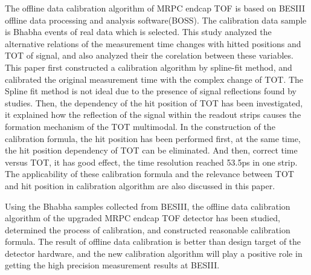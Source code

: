 \begin{englishabstract}
The offline data calibration algorithm of MRPC endcap TOF is based on BESIII offline data processing and analysis software(BOSS). The calibration data sample is Bhabha events of real data which is selected.
This study analyzed the alternative relations of the measurement time changes with hitted positions and TOT of signal, and also  analyzed their the corelation between these variables. This paper first constructed a calibration algorithm by spline-fit method, and calibrated the original measurement time with the complex change of TOT. The Spline fit method is not ideal due to the presence of signal reflections found by studies. Then, the dependency of the hit position of TOT has been investigated, it explained how the reflection of the signal within the readout strips causes the formation mechanism of the TOT multimodal. In the construction of the calibration formula, the hit position has been performed first, at the same time, the hit position dependency of TOT can be eliminated. And then, correct time versus TOT, it has good effect, the time resolution reached 53.5ps in one strip. The applicability of these calibration formula and the relevance between TOT and hit position in calibration algorithm are also discussed in this paper.    

Using the Bhabha samples collected from BESIII, the offline data calibration algorithm of the upgraded MRPC endcap TOF detector has been studied, determined the process of calibration, and constructed reasonable calibration formula. The result of offline data calibration is better than design target of the detector hardware, and the new calibration algorithm will play a positive role in getting the high precision measurement results at BESIII.



\end{englishabstract}